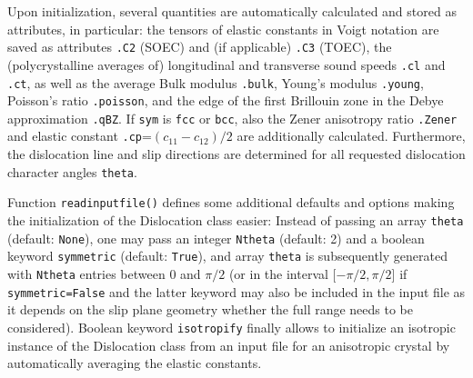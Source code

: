 \documentclass[11pt,letterpaper,oneside,pdftex]{article}
\begin{document}
Upon initialization, several quantities are automatically calculated and stored as attributes, in particular:
the tensors of elastic constants in Voigt notation are saved as attributes \verb|.C2| (SOEC) and (if applicable) \verb|.C3| (TOEC),
the (polycrystalline averages of) longitudinal and transverse sound speeds \verb|.cl| and \verb|.ct|, as well as the average Bulk modulus \verb|.bulk|, Young's modulus \verb|.young|, Poisson's ratio \verb|.poisson|,
and the edge of the first Brillouin zone in the Debye approximation \verb|.qBZ|.
If \verb|sym| is \verb|fcc| or \verb|bcc|, also the Zener anisotropy ratio \verb|.Zener| and elastic constant \verb|.cp|=$(c_{11}-c_{12})/2$ are additionally calculated.
Furthermore, the dislocation line and slip directions are determined for all requested dislocation character angles \verb|theta|.

Function \verb|readinputfile()| defines some additional defaults and options making the initialization of the Dislocation class easier:
Instead of passing an array \verb|theta| (default: \verb|None|), one may pass an integer \verb|Ntheta| (default: 2) and a boolean keyword \verb|symmetric| (default: \verb|True|), and array \verb|theta| is subsequently generated with \verb|Ntheta| entries between 0 and $\pi/2$ (or in the interval [$-\pi/2,\pi/2$] if \verb|symmetric=False| and the latter keyword may also be included in the input file as it depends on the slip plane geometry whether the full range needs to be considered).
Boolean keyword \verb|isotropify| finally allows to initialize an isotropic instance of the Dislocation class from an input file for an anisotropic crystal by automatically averaging the elastic constants.
\end{document}
